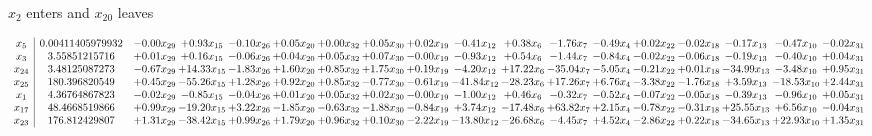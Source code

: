 \documentclass[9pt]{article}
\begin{document}
 $ x_{2} $ enters and $ x_{20} $ leaves 

 \[\begin{array}{c| c c@{\hskip 2pt} c@{\hskip 2pt} c@{\hskip 2pt} c@{\hskip 2pt} c@{\hskip 2pt} c@{\hskip 2pt} c@{\hskip 2pt} c@{\hskip 2pt} c@{\hskip 2pt} c@{\hskip 2pt} c@{\hskip 2pt} c@{\hskip 2pt} c@{\hskip 2pt} c@{\hskip 2pt} c@{\hskip 2pt} c@{\hskip 2pt} }
 x_{5}   &  0.00411405979932 & -0.00 x_{29} & +  0.93 x_{15} & -0.10 x_{26} & +  0.05 x_{20} & +  0.00 x_{32} & +  0.05 x_{30} & +  0.02 x_{19} & -0.41 x_{12} & +  0.38 x_{6} & -1.76 x_{7} & -0.49 x_{4} & +  0.02 x_{22} & -0.02 x_{18} & -0.17 x_{13} & -0.47 x_{10} & -0.02 x_{31}\\
 x_{3}   &  3.55851215716 & +  0.01 x_{29} & +  0.16 x_{15} & -0.06 x_{26} & +  0.04 x_{20} & +  0.05 x_{32} & +  0.07 x_{30} & -0.00 x_{19} & -0.93 x_{12} & +  0.54 x_{6} & -1.44 x_{7} & -0.84 x_{4} & -0.02 x_{22} & -0.06 x_{18} & -0.19 x_{13} & -0.40 x_{10} & +  0.04 x_{31}\\
 x_{24}   &  3.48125087273 & -0.67 x_{29} & + 14.33 x_{15} & -1.83 x_{26} & +  1.60 x_{20} & +  0.85 x_{32} & +  1.75 x_{30} & +  0.19 x_{19} & -4.20 x_{12} & + 17.22 x_{6} & -35.04 x_{7} & -5.05 x_{4} & -0.21 x_{22} & +  0.01 x_{18} & -34.99 x_{13} & -3.48 x_{10} & +  0.95 x_{31}\\
 x_{25}   &  180.396820549 & +  0.45 x_{29} & -55.26 x_{15} & +  1.28 x_{26} & +  0.92 x_{20} & +  0.85 x_{32} & -0.77 x_{30} & -0.61 x_{19} & -41.84 x_{12} & -28.23 x_{6} & + 17.26 x_{7} & +  6.76 x_{4} & -3.38 x_{22} & -1.76 x_{18} & +  3.59 x_{13} & -18.53 x_{10} & +  2.44 x_{31}\\
 x_{1}   &  4.36764867823 & -0.02 x_{29} & -0.85 x_{15} & -0.04 x_{26} & +  0.01 x_{20} & +  0.05 x_{32} & +  0.02 x_{30} & -0.00 x_{19} & -1.00 x_{12} & +  0.46 x_{6} & -0.32 x_{7} & -0.52 x_{4} & -0.07 x_{22} & -0.05 x_{18} & -0.39 x_{13} & -0.96 x_{10} & +  0.05 x_{31}\\
 x_{17}   &  48.4668519866 & +  0.99 x_{29} & -19.20 x_{15} & +  3.22 x_{26} & -1.85 x_{20} & -0.63 x_{32} & -1.88 x_{30} & -0.84 x_{19} & +  3.74 x_{12} & -17.48 x_{6} & + 63.82 x_{7} & +  2.15 x_{4} & -0.78 x_{22} & -0.31 x_{18} & + 25.55 x_{13} & +  6.56 x_{10} & -0.04 x_{31}\\
 x_{23}   &  176.812429807 & +  1.31 x_{29} & -38.42 x_{15} & +  0.99 x_{26} & +  1.79 x_{20} & +  0.96 x_{32} & +  0.10 x_{30} & -2.22 x_{19} & -13.80 x_{12} & -26.68 x_{6} & -4.45 x_{7} & +  4.52 x_{4} & -2.86 x_{22} & +  0.22 x_{18} & -34.65 x_{13} & + 22.93 x_{10} & +  1.35 x_{31}\\

\end{array}\]
\end{document}

